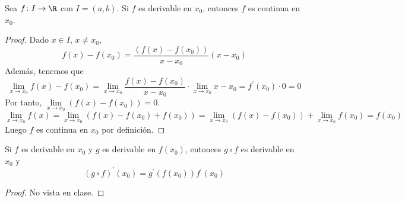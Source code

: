 \begin{theorem}
	Sea \(f \colon I \to \R \) con \(I = (a,b)\).
	Si \(f \) es derivable en \(x_0\), entonces \(f \) es continua en \(x_0 \).
\end{theorem}
\begin{proof}
	Dado \(x \in I \), \(x \neq x_0\),
	\[
		f(x) - f(x_0) = \frac{(f(x) - f(x_0))}{x - x_0} (x - x_0)
	\]
	Además, tenemos que
	\[
		\lim\limits_{x  \to x_0 } f(x) - f(x_0) = \lim\limits_{x  \to x_0 } \frac{f(x) - f(x_0)}{x - x_0} \cdot \lim\limits_{x  \to x_0 } x - x_0 = f^\prime (x_0) \cdot 0 = 0
	\]
	Por tanto, \(\lim\limits_{x  \to x_0 } (f(x) - f(x_0)) = 0 \).
	\[
		\lim\limits_{x  \to x_0 } f(x) = \lim\limits_{x  \to x_0 } (f(x) - f(x_0) + f(x_0)) = \lim\limits_{x  \to x_0 } (f(x) - f(x_0)) + \lim\limits_{x  \to x_0 } f(x_0) = f(x_0)
	\]
	Luego \(f \) es continua en \(x_0 \) por definición.
\end{proof}
\begin{theorem}
	Si \(f \) es derivable en \(x_0 \) y \(g \) es derivable en \(f(x_0 )\), entonces \(g \circ f \) es derivable en \(x_0 \) y
	\[
		(g \circ f)^\prime (x_0) = g^\prime (f(x_0)) f^\prime (x_0)
	\]
\end{theorem}
\begin{proof}
	No vista en clase.
\end{proof}
